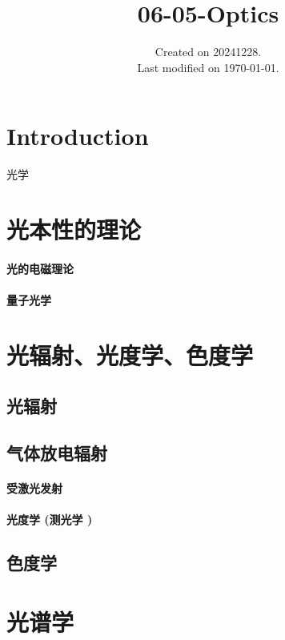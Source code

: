 \documentclass[UTF8]{../06-Physics}
\begin{document}
\title{06-05-Optics}
\date{Created on 20241228.\\   Last modified on \today.}
\maketitle
\tableofcontents




\chapter{Introduction}
光学




\chapter{光本性的理论}
    \subsubsection{光的电磁理论}
    \subsubsection{量子光学}




\chapter{光辐射、光度学、色度学}
\section{光辐射}
\section{气体放电辐射}
    \subsubsection{受激光发射}
    \subsubsection{光度学 (测光学 )}
\section{色度学}


\chapter{光谱学}
\end{document}
